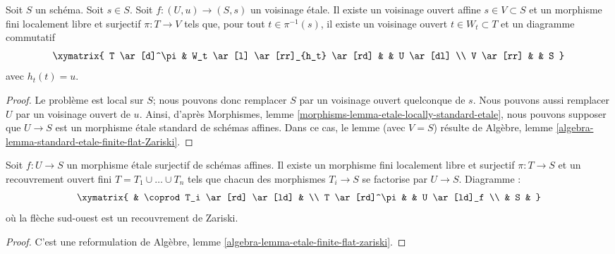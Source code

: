 \begin{lemma}
\label{lemma-dominate-etale-neighbourhood-finite-flat}
Soit $S$ un schéma. Soit $s \in S$.
Soit $f : (U, u) \to (S, s)$ un voisinage \'etale.
Il existe un voisinage ouvert affine $s \in V \subset S$
et un morphisme fini localement libre et surjectif $\pi : T \to V$
tels que, pour tout $t \in \pi^{-1}(s)$, il existe un
voisinage ouvert $t \in W_t \subset T$ et un
diagramme commutatif
$$
\xymatrix{
T \ar[d]^\pi & W_t \ar[l] \ar[rr]_{h_t} \ar[rd] & & U \ar[dl] \\
V \ar[rr] & & S
}
$$
avec $h_t(t) = u$.
\end{lemma}

\begin{proof}
Le problème est local sur $S$; nous pouvons donc remplacer $S$ par un
voisinage ouvert quelconque de $s$.
Nous pouvons aussi remplacer $U$ par un voisinage ouvert de $u$.
Ainsi, d'après Morphismes, lemme \ref{morphisms-lemma-etale-locally-standard-etale},
nous pouvons supposer que
$U \to S$ est un morphisme \'etale standard de schémas affines.
Dans ce cas, le lemme (avec $V = S$) résulte de
Algèbre, lemme \ref{algebra-lemma-standard-etale-finite-flat-Zariski}.
\end{proof}

\begin{lemma}
\label{lemma-dominate-etale-affine-finite-flat}
Soit $f : U \to S$ un morphisme \'etale surjectif de schémas affines.
Il existe un morphisme fini localement libre et surjectif
$\pi : T \to S$ et un recouvrement ouvert fini
$T = T_1 \cup \ldots \cup T_n$ tels que chacun des morphismes
$T_i \to S$ se factorise par $U \to S$. Diagramme :
$$
\xymatrix{
& \coprod T_i  \ar[rd] \ar[ld] & \\
T \ar[rd]^\pi & & U \ar[ld]_f \\
& S &
}
$$
où la flèche sud-ouest est un recouvrement de Zariski.
\end{lemma}

\begin{proof}
C'est une reformulation de
Algèbre, lemme \ref{algebra-lemma-etale-finite-flat-zariski}.
\end{proof}

